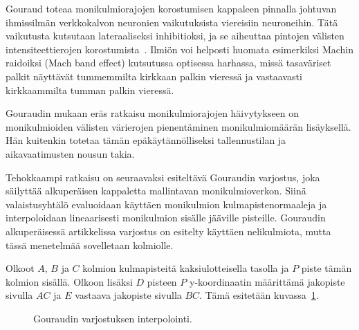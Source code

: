 \documentclass[finnish]{tktltiki2}
\theoremstyle{definition}
\theoremstyle{remark}
\begin{document}
Gouraud toteaa monikulmiorajojen korostumisen kappaleen pinnalla johtuvan ihmissilmän verkkokalvon neuronien vaikutuksista viereisiin neuroneihin. Tätä vaikutusta kutsutaan lateraaliseksi inhibitioksi, ja se aiheuttaa pintojen välisten intensiteettierojen korostumista~\cite[s. 29]{Glassner}. Ilmiön voi helposti huomata esimerkiksi Machin raidoiksi (Mach band effect) kutsutussa optisessa harhassa, missä tasaväriset palkit näyttävät tummemmilta kirkkaan palkin vieressä ja vastaavasti kirkkaammilta tumman palkin vieressä.

Gouraudin mukaan eräs ratkaisu monikulmiorajojen häivytykseen on monikulmioiden välisten värierojen pienentäminen monikulmiomäärän lisäyksellä. Hän kuitenkin totetaa tämän epäkäytännölliseksi tallennustilan ja aikavaatimusten nousun takia.

Tehokkaampi ratkaisu on seuraavaksi esiteltävä Gouraudin varjostus, joka säilyttää alkuperäisen kappaletta mallintavan monikulmioverkon. Siinä valaistusyhtälö evaluoidaan käyttäen monikulmion kulmapistenormaaleja ja interpoloidaan lineaarisesti monikulmion sisälle jääville pisteille. Gouraudin alkuperäisessä artikkelissa varjostus on esitelty käyttäen nelikulmiota, mutta tässä menetelmää sovelletaan kolmiolle.

Olkoot $A$, $B$ ja $C$ kolmion kulmapisteitä kaksiulotteisella tasolla ja $P$ piste tämän kolmion sisällä. Olkoon lisäksi $D$ pisteen $P$ y-koordinaatin määrittämä jakopiste sivulla $AC$ ja $E$ vastaava jakopiste sivulla $BC$. Tämä esitetään kuvassa~\ref{fig:Gouraud_interpolointi}.

\begin{figure}[h]
\centering
{}
\caption{Gouraudin varjostuksen interpolointi.}
\label{fig:Gouraud_interpolointi}
\end{figure}
\end{document}
